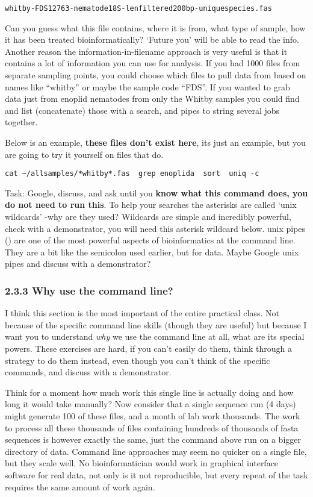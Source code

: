 \documentclass[11pt]{article}
\begin{document}
\texttt{whitby-FDS12763-nematode18S-lenfiltered200bp-uniquespecies.fas}

Can you guess what this file contains, where it is from, what type of
sample, how it has been treated bioinformatically? `Future you' will be
able to read the info. Another reason the information-in-filename
approach is very useful is that it contains a lot of information you can
use for analysis. If you had 1000 files from separate sampling points,
you could choose which files to pull data from based on names like
``whitby'' or maybe the sample code ``FDS''. If you wanted to grab data
just from enoplid nematodes from only the Whitby samples you could find
and list (concatenate) those with a search, and pipes
\texttt{\textbar{}} to string several jobs together.

Below is an example, \textbf{these files don't exist here}, its just an
example, but you are going to try it yourself on files that do.

\texttt{cat\ \textasciitilde{}/allsamples/*whitby*.fas\ \textbar{}\ grep\ enoplida\ \textbar{}\ sort\ \textbar{}\ uniq\ -c}

Task: Google, discuss, and ask until you \textbf{know what this command
does, you do not need to run this}. To help your searches the asterisks
are called `unix wildcards' -why are they used? Wildcards are simple and
incredibly powerful, check with a demonstrator, you will need this
asterisk wildcard below. unix pipes (\texttt{\textbar{}}) are one of the
most powerful aspects of bioinformatics at the command line. They are a
bit like the semicolon used earlier, but for data. Maybe Google unix
pipes and discuss with a demonstrator?

    \hypertarget{why-use-the-command-line}{%
\subsubsection{2.3.3 Why use the command
line?}\label{why-use-the-command-line}}

I think this section is the most important of the entire practical
class. Not because of the specific command line skills (though they are
useful) but because I want you to understand \emph{why} we use the
command line at all, what are its special powers. These exercises are
hard, if you can't easily do them, think through a strategy to do them
instead, even though you can't think of the specific commands, and
discuss with a demonstrator.

Think for a moment how much work this single line is actually doing and
how long it would take manually? Now consider that a single sequence run
(4 days) might generate 100 of these files, and a month of lab work
thousands. The work to process all these thousands of files containing
hundreds of thousands of fasta sequences is however exactly the same,
just the command above run on a bigger directory of data. Command line
approaches may seem no quicker on a single file, but they scale well. No
bioinformatician would work in graphical interface software for real
data, not only is it not reproducible, but every repeat of the task
requires the same amount of work again.
\end{document}

